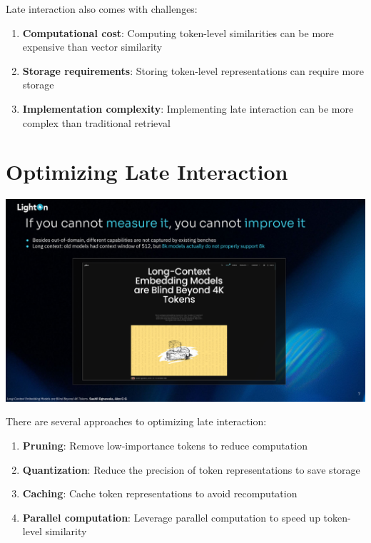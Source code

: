 \documentclass[
  letterpaper,
  oneside]{scrbook}
\providecommand{\tightlist}{%
  \setlength{\itemsep}{0pt}\setlength{\parskip}{0pt}}\usepackage{longtable,booktabs,array}
\begin{document}
Late interaction also comes with challenges:

\begin{enumerate}
\def\labelenumi{\arabic{enumi}.}
\tightlist
\item
  \textbf{Computational cost}: Computing token-level similarities can be
  more expensive than vector similarity
\item
  \textbf{Storage requirements}: Storing token-level representations can
  require more storage
\item
  \textbf{Implementation complexity}: Implementing late interaction can
  be more complex than traditional retrieval
\end{enumerate}

\section{Optimizing Late Interaction}\label{optimizing-late-interaction}

\includegraphics{chapters/../p4-images/slide_7.png}

There are several approaches to optimizing late interaction:

\begin{enumerate}
\def\labelenumi{\arabic{enumi}.}
\tightlist
\item
  \textbf{Pruning}: Remove low-importance tokens to reduce computation
\item
  \textbf{Quantization}: Reduce the precision of token representations
  to save storage
\item
  \textbf{Caching}: Cache token representations to avoid recomputation
\item
  \textbf{Parallel computation}: Leverage parallel computation to speed
  up token-level similarity
\end{enumerate}
\end{document}
